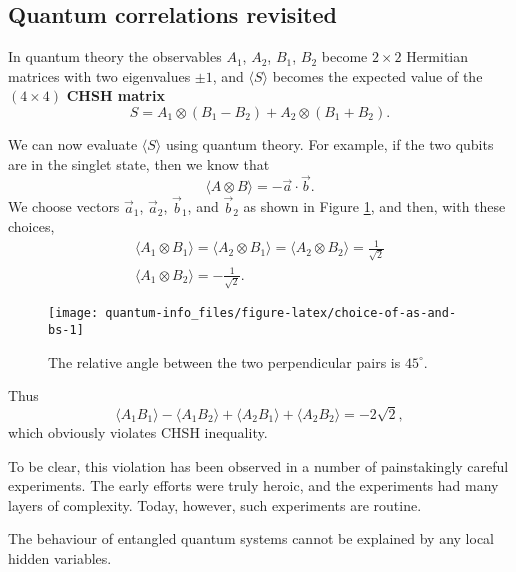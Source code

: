 \documentclass[fleqn]{article}
\newenvironment{idea}{\noindent}{\medskip}
\begin{document}
\hypertarget{quantum-correlations-revisited}{%
\subsection{Quantum correlations revisited}\label{quantum-correlations-revisited}}

In quantum theory the observables \(A_1\), \(A_2\), \(B_1\), \(B_2\) become \(2\times 2\) Hermitian matrices with two eigenvalues \(\pm 1\), and \(\langle S\rangle\) becomes the expected value of the \((4\times 4)\) \textbf{CHSH matrix}
\[
  S
  = A_1\otimes(B_1-B_2) + A_2\otimes(B_1+B_2).
\]

We can now evaluate \(\langle S\rangle\) using quantum theory.
For example, if the two qubits are in the singlet state, then we know that
\[
  \langle A\otimes B\rangle = -\vec{a}\cdot\vec{b}.
\]
We choose vectors \(\vec{a}_1\), \(\vec{a}_2\), \(\vec{b}_1\), and \(\vec{b}_2\) as shown in Figure \ref{fig:choice-of-as-and-bs}, and then, with these choices,
\[
\begin{gathered}
  \langle A_1\otimes B_1\rangle
  = \langle A_2\otimes B_1\rangle
  = \langle A_2\otimes B_2\rangle
  = \frac{1}{\sqrt 2}
\\\langle A_1\otimes B_2\rangle
   = -\frac{1}{\sqrt 2}.
\end{gathered}
\]



\begin{figure}[H]

{\centering \texttt{[image: quantum-info\_files/figure-latex/choice-of-as-and-bs-1]} 

}

\caption{The relative angle between the two perpendicular pairs is \(45^\circ\).}\label{fig:choice-of-as-and-bs}
\end{figure}

Thus
\[
  \langle A_1 B_1\rangle - \langle A_1 B_2\rangle + \langle A_2 B_1\rangle + \langle A_2 B_2\rangle
  = -2\sqrt{2},
\]
which obviously violates CHSH inequality.

To be clear, this violation has been observed in a number of painstakingly careful experiments.
The early efforts were truly heroic, and the experiments had many layers of complexity.
Today, however, such experiments are routine.

\begin{idea}

The behaviour of entangled quantum systems cannot be explained by any local hidden variables.

\end{idea}
\end{document}
